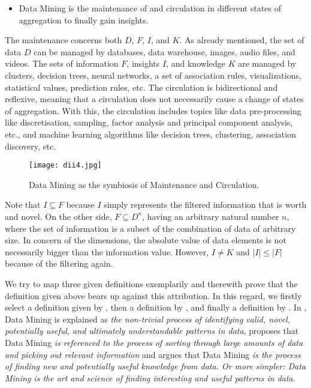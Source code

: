 \documentclass[10pt,latex8]{article}
\begin{document}
\begin{itemize}
    \item Data Mining is the maintenance of and circulation in different states of aggregation to finally gain insights.
\end{itemize}

The maintenance concerns both $D$, $F$, $I$, and $K$. As already mentioned, the set of data $D$ can be managed by databases, data warehouse, images, audio files, and videos. The sets of information $F$, insights $I$, and knowledge $K$ are managed by clusters, decision trees, neural networks, a set of association rules, visualizations, statistical values, prediction rules, etc. The circulation is bidirectional and reflexive, meaning that a circulation does not necessarily cause a change of states of aggregation. With this, the circulation includes topics like data pre-processing like discretisation, sampling, factor analysis and principal component analysis, etc., and machine learning algorithms like decision trees, clustering, association discovery, etc.

\begin{figure}[htbp]
   \centering
   \texttt{[image: dii4.jpg]} 
   \caption{Data Mining as the symbiosis of Maintenance and Circulation.}
   \label{fig:dii4}
\end{figure}

Note that $I\subseteq F$ because $I$ simply represents the filtered information that is worth and novel. On the other side, $F\subseteq D^n$, having an arbitrary natural number $n$, where the set of information is a subset of the combination of data of arbitrary size. In concern of the dimensions, the absolute value of data elements is not necessarily bigger than the information value. However, $I \neq K$ and $|I|\leq |F|$ because of the filtering again.

We try to map three given definitions exemplarily and therewith prove that the definition given above bears up against this attribution. In this regard, we firstly select a definition given by \cite{fayyad}, then a definition by \cite{wikipedia}, and finally a definition by \cite{kdnuggets}. In \cite{fayyad}, Data Mining is explained as \textit{the non-trivial process of identifying valid, novel, potentially useful, and ultimately understandable patterns in data}, \cite{wikipedia} proposes that Data Mining \textit{is referenced to the process of sorting through large amounts of data and picking out relevant information} and \cite{kdnuggets} argues that Data Mining \textit{is the process of finding new and potentially useful knowledge from data. Or more simpler: Data Mining is the art and science of finding interesting and useful patterns in data.}
\end{document}
